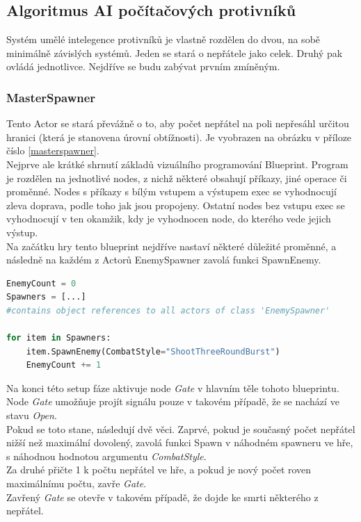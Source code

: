 \documentclass[12pt,a4paper,hidelinks]{article}
\begin{document}
\subsection{Algoritmus AI počítačových protivníků}
Systém umělé intelegence protivníků je vlastně rozdělen do dvou, na sobě minimálně závislých systémů. Jeden se stará o nepřátele jako celek. Druhý pak ovládá jednotlivce. Nejdříve se budu zabývat prvním zmíněným.\\
\subsubsection{MasterSpawner}
Tento Actor se stará převážně o to, aby počet nepřátel na poli nepřesáhl určitou hranici (která je stanovena úrovní obtížnosti). Je vyobrazen na obrázku v příloze číslo \ref{masterspawner}.\\
Nejprve ale krátké shrnutí základů vizuálního programování Blueprint. Program je rozdělen na jednotlivé nodes, z nichž některé obsahují příkazy, jiné operace či proměnné. Nodes s příkazy s bílým vstupem a výstupem exec se vyhodnocují zleva doprava, podle toho jak jsou propojeny. Ostatní nodes bez vstupu exec se vyhodnocují v ten okamžik, kdy je vyhodnocen node, do kterého vede jejich výstup.\\
Na začátku hry tento blueprint nejdříve nastaví některé důležité proměnné, a následně na každém z Actorů EnemySpawner zavolá funkci SpawnEnemy.\\
\begin{lstlisting}[language=Python]
EnemyCount = 0
Spawners = [...]
#contains object references to all actors of class 'EnemySpawner'

for item in Spawners:
	item.SpawnEnemy(CombatStyle="ShootThreeRoundBurst")
	EnemyCount += 1
\end{lstlisting}
Na konci této setup fáze aktivuje node \textit{Gate} v hlavním těle tohoto blueprintu.\\
Node \textit{Gate} umožňuje projít signálu pouze v takovém případě, že se nachází ve stavu \textit{Open}.\\
Pokud se toto stane, následují dvě věci. Zaprvé, pokud je současný počet nepřátel nižší než maximální dovolený, zavolá funkci Spawn v náhodném spawneru ve hře, s náhodnou hodnotou argumentu \textit{CombatStyle}.\\
Za druhé přičte 1 k počtu nepřátel ve hře, a pokud je nový počet roven maximálnímu počtu, zavře \textit{Gate}.\\
Zavřený \textit{Gate} se otevře v takovém případě, že dojde ke smrti některého z nepřátel.
\end{document}
